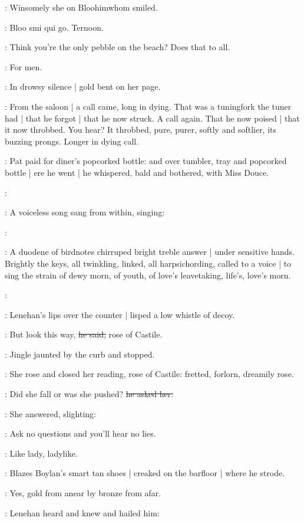 :
Winsomely she on Bloohimwhom smiled.

:
Bloo smi qui go.
Ternoon.

\BloomInt:
Think you're the only pebble on the beach?
Does that to all.

\BloomInt:
For men.

:
In drowsy silence |
gold bent on her page.

:
From the saloon |
a call came,
long in dying.
That was a tuningfork the tuner had |
that he forgot |
that he now struck.
A call again.
That he now poised |
that it now throbbed.
You hear?
It throbbed,
pure,
purer,
softly and softlier,
its buzzing prongs.
Longer in dying call.

:
Pat paid for diner's popcorked bottle:
and over tumbler, tray and popcorked bottle |
ere he went |
he whispered,
bald and bothered,
with Miss Douce.

\simon:

:
A voiceless song sang from within,
singing:

\simon:

:
A duodene of birdnotes chirruped bright treble answer |
under sensitive hands.
Brightly the keys,
all twinkling,
linked,
all harpsichording,
called to a voice |
to sing the strain of dewy morn,
of youth,
of love's leavetaking,
life's,
love's morn.

\simon:

:
Lenehan's lips over the counter |
lisped a low whistle of decoy.

\lenehan:
But look this way,
\sout{he said,}
rose of Castile.

:
Jingle jaunted by the curb
and stopped.

:
She rose and closed her reading,
rose of Castile:
fretted,
forlorn,
dreamily rose.

\lenehan:
Did she fall or was she pushed?
\sout{he asked her.}

:
She answered,
slighting:

\MissK:
Ask no questions and you'll hear no lies.

:
Like lady,
ladylike.

:
Blazes Boylan's smart tan shoes |
creaked on the barfloor |
where he strode.

:
Yes,
gold from anear
by bronze from afar.

:
Lenehan heard and knew and hailed him:

